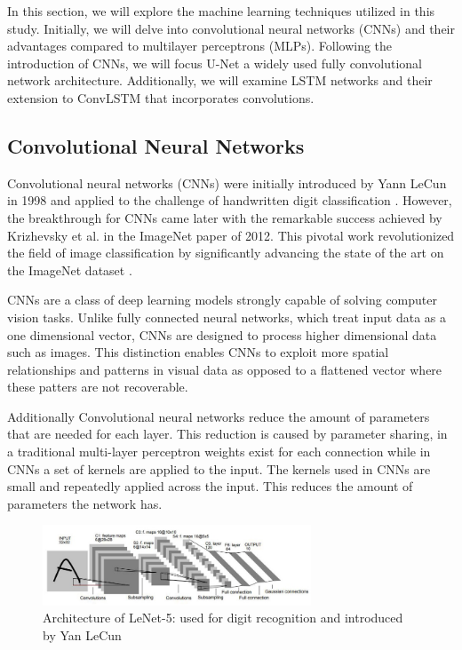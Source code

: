In this section, we will explore the machine learning techniques utilized
in this study. Initially, we will delve into convolutional neural networks
(CNNs) and their advantages compared to multilayer perceptrons (MLPs).
Following the introduction of CNNs, we will focus U-Net a widely used fully convolutional network architecture.
Additionally, we will examine LSTM networks and their extension to ConvLSTM that incorporates convolutions.
\medskip

\subsection{Convolutional Neural Networks}

Convolutional neural networks (CNNs) were initially introduced by Yann LeCun in 1998 and applied to the challenge of handwritten digit classification \cite{lecun-1998}. However, the breakthrough for CNNs came later with the remarkable success achieved by Krizhevsky et al. in the ImageNet paper of 2012. This pivotal work revolutionized the field of image classification by significantly advancing the state of the art on the ImageNet dataset \cite{krizhevsky-2017}.

CNNs are a class of deep learning models strongly capable of solving computer vision tasks. Unlike fully connected neural networks, which treat input data as a one dimensional vector, CNNs are designed to process higher dimensional data such as images.
This distinction enables CNNs to exploit more spatial relationships and patterns in visual data as opposed to a flattened vector where these patters are not recoverable.

Additionally Convolutional neural networks reduce the amount of parameters that are needed for each layer. This reduction is caused by parameter sharing, in a
traditional multi-layer perceptron weights exist for each connection while in CNNs a set of kernels are applied to the input. The kernels used in CNNs are small and repeatedly applied across the input.
This reduces the amount of parameters the network has. 

\begin{figure}
  \includegraphics[width=8cm]{../images/cun.jpeg}
  \caption[short]{Architecture of LeNet-5: used for digit recognition and introduced by Yan LeCun \cite{lecun-1998}}
\end{figure}

